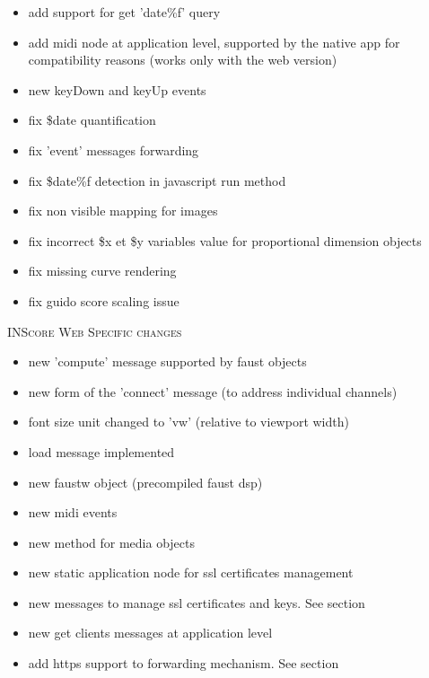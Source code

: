 
\newcommand{\inscoreweb}	{\hspace{4mm} \textsc{INScore Web Specific changes}}

\begin{itemize}
\item add support for get 'date\%f' query
\item add midi node at application level, supported by the native app for compatibility reasons (works only with the web version)
\item new keyDown and keyUp events
\item fix \$date quantification
\item fix 'event' messages forwarding
\item fix \$date\%f detection in javascript run method
\item fix non visible mapping for images
\item fix incorrect \$x et \$y variables value for proportional dimension objects
\item fix missing curve rendering
\item fix guido score scaling issue
\end{itemize}

\inscoreweb
\begin{itemize}
\item new 'compute' message supported by faust objects
\item new form of the 'connect' message (to address individual channels)
\item font size unit changed to 'vw' (relative to viewport width)
\item load message implemented
\item new faustw object (precompiled faust dsp)
\item new midi events
\end{itemize}


\begin{itemize}
\item new  method for media objects
\item new  static application node for ssl certificates management
\item new    messages to manage ssl certificates and keys. See section 
\item new get clients messages at application level
\item add https support to forwarding mechanism. See section 
\end{itemize}

